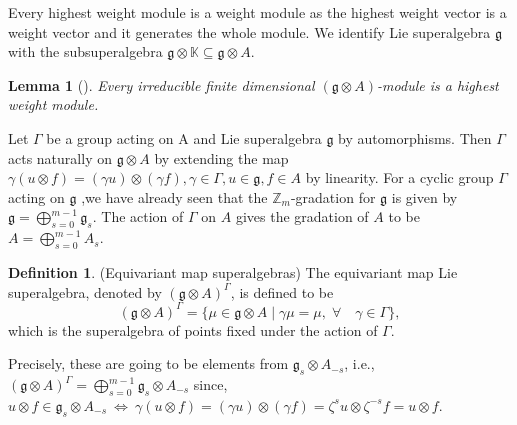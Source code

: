 \documentclass[11pt]{amsart}
\theoremstyle{plain}
\newtheorem{lemma}[thm]{Lemma}
\theoremstyle{definition}
\newtheorem{defn}[thm]{Definition}
\newcommand{\g}{\mathfrak{g}}
\begin{document}
Every highest weight module is a weight module as the highest weight vector is a weight vector and it generates the whole module. We identify Lie superalgebra $\g$ with the subsuperalgebra $\g\otimes \mathbb{K}\subseteq \g\otimes A$.
\begin{lemma}[\cite{Sav14}]\label{lem:3}
    Every irreducible finite dimensional $(\g\otimes A)$-module is a highest weight module.
\end{lemma}


 Let $\Gamma$ be a group acting on A and Lie superalgebra $\g$ by automorphisms. Then $\Gamma$ acts naturally on $\g\otimes A$ by extending the map $\gamma(u\otimes f)=(\gamma u)\otimes(\gamma f), \gamma\in\Gamma,u\in\g, f\in A$ by linearity. For a cyclic group $\Gamma$ acting on $\g$ ,we have already seen that the $\mathbb{Z}_{m}$-gradation for $\g$ is given by $\g=\bigoplus_{s=0}^{m-1}\g_{s}$. The action of $\Gamma$ on $A$ gives the gradation of $A$ to be $A=\bigoplus_{s=0}^{m-1}A_{s}$.

 \begin{defn}(Equivariant map superalgebras)
The equivariant map Lie superalgebra, denoted by $(\g\otimes A)^{\Gamma}$, is defined to be
 \begin{equation*}
     (\g\otimes A)^\Gamma = \{\mu\in\g\otimes A \mid \gamma\mu=\mu, \;\forall\quad \gamma\in\Gamma\},
 \end{equation*}
 which is the superalgebra of points fixed under the  action of $\Gamma$.
 \end{defn}
 Precisely, these are going to be elements from $\g_{s}\otimes A_{-s}$, i.e., $(\g\otimes A)^{\Gamma}=\bigoplus_{s=0}^{m-1}\g_s\otimes A_{-s}$ since, $u\otimes f\in \g_{s}\otimes A_{-s}~\Leftrightarrow ~\gamma(u\otimes f)=(\gamma u)\otimes(\gamma f)=\zeta^{s} u\otimes\zeta^{-s}f =u\otimes f$.
\end{document}
